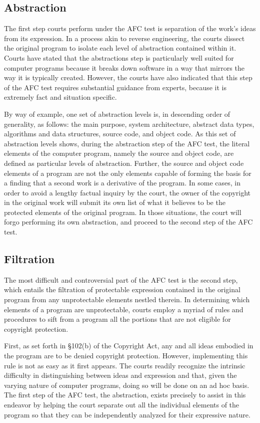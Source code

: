 \subsection{Abstraction}

The first step courts perform under the AFC test is separation of the
work's ideas from its expression. In a process akin to reverse
engineering, the courts dissect the original program to isolate each level
of abstraction contained within it. Courts have stated that the
abstractions step is particularly well suited for computer programs
because it breaks down software in a way that mirrors the way it is
typically created. However, the courts have also indicated that this step
of the AFC test requires substantial guidance from experts, because it is
extremely fact and situation specific.

By way of example, one set of abstraction levels is, in descending order
of generality, as follows: the main purpose, system architecture, abstract
data types, algorithms and data structures, source code, and object
code. As this set of abstraction levels shows, during the abstraction step
of the AFC test, the literal elements of the computer program, namely the
source and object code, are defined as particular levels of
abstraction. Further, the source and object code elements of a program are
not the only elements capable of forming the basis for a finding that a
second work is a derivative of the program. In some cases, in order to
avoid a lengthy factual inquiry by the court, the owner of the copyright in
the original work will submit its own list of what it believes to be the
protected elements of the original program. In those situations, the court
will forgo performing its own abstraction, and proceed to the second step of
the AFC test.

\subsection{Filtration}

The most difficult and controversial part of the AFC test is the second
step, which entails the filtration of protectable expression contained in
the original program from any unprotectable elements nestled therein. In
determining which elements of a program are unprotectable, courts employ a
myriad of rules and procedures to sift from a program all the portions
that are not eligible for copyright protection.

First, as set forth in \S 102(b) of the Copyright Act, any and all ideas
embodied in the program are to be denied copyright protection. However,
implementing this rule is not as easy as it first appears. The courts
readily recognize the intrinsic difficulty in distinguishing between ideas
and expression and that, given the varying nature of computer programs,
doing so will be done on an ad hoc basis. The first step of the AFC test,
the abstraction, exists precisely to assist in this endeavor by helping
the court separate out all the individual elements of the program so that
they can be independently analyzed for their expressive nature.

